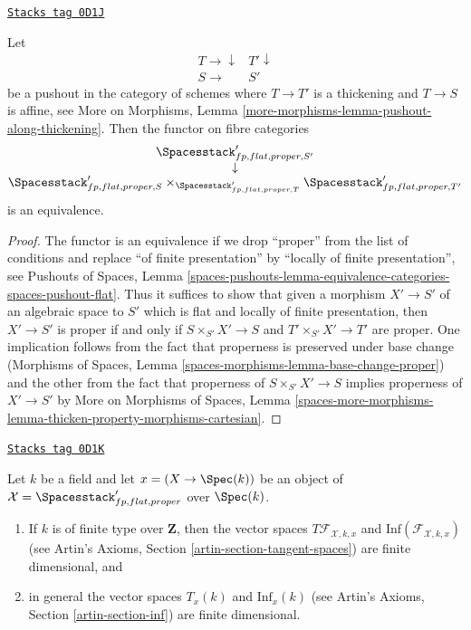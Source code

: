 \begin{lemma}
\label{quot-lemma-spaces-RS-star}
\href{https://stacks.math.columbia.edu/tag/0D1J}{\texttt{Stacks tag 0D1J}}

Let
$$
\begin{array}{cc}T \longrightarrow\downarrow & T' \downarrow \\ S \longrightarrow & S'\end{array}
$$
be a pushout in the category of schemes where
$T \to T'$ is a thickening and $T \to S$ is affine, see
More on Morphisms, Lemma \ref{more-morphisms-lemma-pushout-along-thickening}.
Then the functor on fibre categories
$$
\begin{matrix}
\Spacesstack'_{fp, flat, proper, S'} \\
\downarrow \\
\Spacesstack'_{fp, flat, proper, S}
\times_{\Spacesstack'_{fp, flat, proper, T}}
\Spacesstack'_{fp, flat, proper, T'}
\end{matrix}
$$
is an equivalence.
\end{lemma}

\begin{proof}
The functor is an equivalence if we drop ``proper'' from the list
of conditions and replace ``of finite presentation'' by
``locally of finite presentation'', see Pushouts of Spaces, Lemma
\ref{spaces-pushouts-lemma-equivalence-categories-spaces-pushout-flat}.
Thus it suffices to show that given a morphism
$X' \to S'$ of an algebraic space to $S'$ which is
flat and locally of finite presentation, then
$X' \to S'$ is proper if and only if $S \times_{S'} X' \to S$
and $T' \times_{S'} X' \to T'$ are proper.
One implication follows from the fact that
properness is preserved under base change
(Morphisms of Spaces, Lemma \ref{spaces-morphisms-lemma-base-change-proper})
and the other from the fact that properness of $S \times_{S'} X' \to S$
implies properness of $X' \to S'$ by
More on Morphisms of Spaces, Lemma
\ref{spaces-more-morphisms-lemma-thicken-property-morphisms-cartesian}.
\end{proof}

\begin{lemma}
\label{quot-lemma-spaces-tangent-space}
\href{https://stacks.math.columbia.edu/tag/0D1K}{\texttt{Stacks tag 0D1K}}

Let $k$ be a field and let $x = (X \to \Spec(k))$ be an object of
$\mathcal{X} = \Spacesstack'_{fp, flat, proper}$ over $\Spec(k)$.
\begin{enumerate}
\item If $k$ is of finite type over $\mathbf{Z}$, then
the vector spaces $T\mathcal{F}_{\mathcal{X}, k, x}$ and
$\text{Inf}(\mathcal{F}_{\mathcal{X}, k, x})$
(see Artin's Axioms, Section \ref{artin-section-tangent-spaces})
are finite dimensional, and
\item in general the vector spaces $T_x(k)$ and $\text{Inf}_x(k)$
(see Artin's Axioms, Section \ref{artin-section-inf})
are finite dimensional.
\end{enumerate}
\end{lemma}

